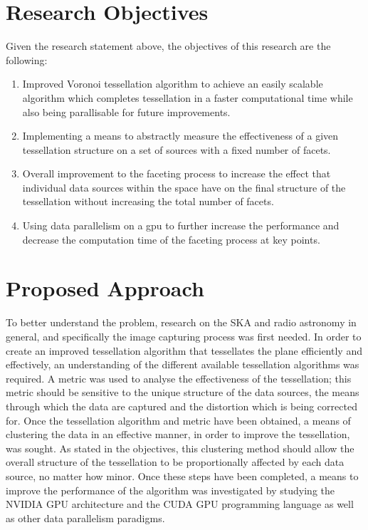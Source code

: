 \section{Research Objectives}\label{int:sec:goals}
Given the research statement above, the objectives of this research are the following:
\begin{enumerate}
\item Improved Voronoi tessellation algorithm to achieve an easily scalable algorithm which completes tessellation in a faster computational time while also being parallisable for future improvements.
\item Implementing a means to abstractly measure the effectiveness of a given tessellation structure on a set of sources with a fixed number of facets.
\item Overall improvement to the faceting process to increase the effect that individual data sources within the space have on the final structure of the tessellation without increasing the total number of facets.
\item Using data parallelism on a \gls{gpu} to further increase the performance and decrease the computation time of the faceting process at key points.
\end{enumerate}
\section{Proposed Approach}
To better understand the problem, research on the SKA and radio astronomy in general, and specifically the image capturing process was first needed. In order to create an improved tessellation algorithm that tessellates the plane efficiently and effectively, an understanding of the different available tessellation algorithms was required. A metric was used to analyse the effectiveness of the tessellation; this metric should be sensitive to the unique structure of the data sources, the means through which the data are captured and the distortion which is being corrected for. Once the tessellation algorithm and metric have been obtained, a means of clustering the data in an effective manner, in order to improve the tessellation, was sought. As stated in the objectives, this clustering method should allow the overall structure of the tessellation to be proportionally affected by each data source, no matter how minor. Once these steps have been completed, a means to improve the performance of the algorithm was investigated by studying the NVIDIA GPU architecture and the CUDA GPU programming language as well as other data parallelism paradigms.
